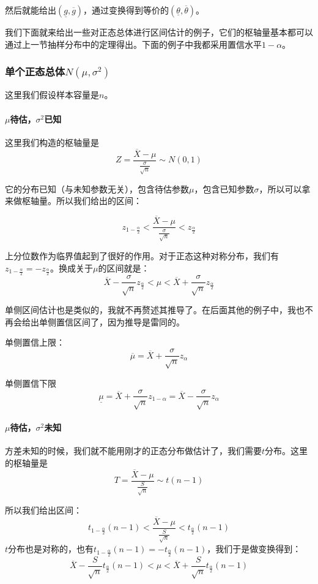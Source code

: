 然后就能给出$(\underline{g},\overline{g})$，通过变换得到等价的$(\underline{\theta},\overline{\theta})$。

我们下面就来给出一些对正态总体进行区间估计的例子，它们的枢轴量基本都可以通过上一节抽样分布中的定理得出。下面的例子中我都采用置信水平$1-\alpha$。

\subsubsection{单个正态总体$N(\mu,\sigma^2)$}
这里我们假设样本容量是$n$。

\paragraph{$\mu$待估，$\sigma^2$已知}

这里我们构造的枢轴量是
\[
Z=\frac{\overline{X}-\mu}{\frac{\sigma}{\sqrt{n}}}\sim N(0,1)
\]

它的分布已知（与未知参数无关），包含待估参数$\mu$，包含已知参数$\sigma$，所以可以拿来做枢轴量。所以我们给出的区间：

\[
z_{1-\frac{\alpha}{2}}< \frac{\overline{X}-\mu}{\frac{\sigma}{\sqrt{n}}} <z_{\frac{\alpha}{2}}
\]

上分位数作为临界值起到了很好的作用。对于正态这种对称分布，我们有$z_{1-\frac{\alpha}{2}}=-z_{\frac{\alpha}{2}}$。换成关于$\mu$的区间就是：
\[
\overline{X} - \frac{\sigma}{\sqrt{n}}z_{\frac{\alpha}{2}}<\mu< \overline{X} + \frac{\sigma}{\sqrt{n}}z_{\frac{\alpha}{2}}
\]

单侧区间估计也是类似的，我就不再赘述其推导了。在后面其他的例子中，我也不再会给出单侧置信区间了，因为推导是雷同的。

单侧置信上限：
\[
\overline{\mu} = \overline{X} + \frac{\sigma}{\sqrt{n}}z_{\alpha}
\]

单侧置信下限
\[
\underline{\mu} = \overline{X} + \frac{\sigma}{\sqrt{n}}z_{1-\alpha} = \overline{X} - \frac{\sigma}{\sqrt{n}}z_{\alpha}
\]

\paragraph{$\mu$待估，$\sigma^2$未知}

方差未知的时候，我们就不能用刚才的正态分布做估计了，我们需要$t$分布。这里的枢轴量是
\[
T =\frac{\overline{X}-\mu}{\frac{S}{\sqrt{n}}} \sim t(n-1)
\]

所以我们给出区间：
\[
t_{1-\frac{\alpha}{2}}(n-1)<\frac{\overline{X}-\mu}{\frac{S}{\sqrt{n}}} < t_{\frac{\alpha}{2}}(n-1)
\]
$t$分布也是对称的，也有$t_{1-\frac{\alpha}{2}}(n-1)=-t_{\frac{\alpha}{2}}(n-1)$，我们于是做变换得到：
\[
\overline{X}-\frac{S}{\sqrt{n}}t_{\frac{\alpha}{2}}(n-1)<\mu<\overline{X}+\frac{S}{\sqrt{n}}t_{\frac{\alpha}{2}}(n-1)
\]

